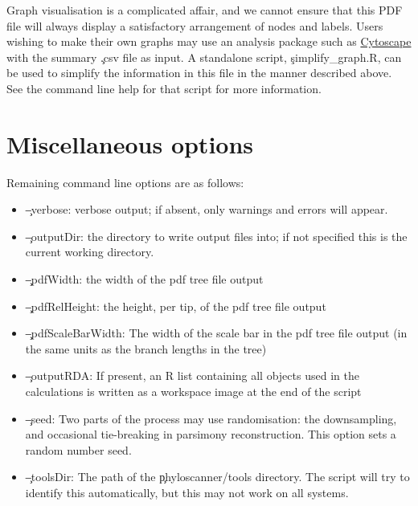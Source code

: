 Graph visualisation is a complicated affair, and we cannot ensure that this PDF file will always display a satisfactory arrangement of nodes and labels. Users wishing to make their own graphs may use an analysis package such as \href{http://www.cytoscape.org/}{Cytoscape} with the summary \c{.csv} file as input. A standalone script, \c{simplify\_graph.R}, can be used to simplify the information in this file in the manner described above. See the command line help for that script for more information.

\section{Miscellaneous options}

Remaining command line options are as follows:
\begin{itemize}
\item \c{--verbose}: verbose output; if absent, only warnings and errors will appear.
\item \c{--outputDir}: the directory to write output files into; if not specified this is the current working directory.
\item \c{--pdfWidth}: the width of the pdf tree file output
\item \c{--pdfRelHeight}: the height, per tip, of the pdf tree file output
\item \c{--pdfScaleBarWidth}: The width of the scale bar in the pdf tree file output (in the same units as the branch lengths in the tree)
\item \c{--outputRDA}: If present, an R list containing all objects used in the calculations is written as  a workspace image at the end of the script
\item \c{--seed}: Two parts of the process may use randomisation: the downsampling, and occasional tie-breaking in parsimony reconstruction.
This option sets a random number seed.
\item \c{--toolsDir}: The path of the \c{phyloscanner/tools} directory.
The script will try to identify this automatically, but this may not work on all systems.
\end{itemize}